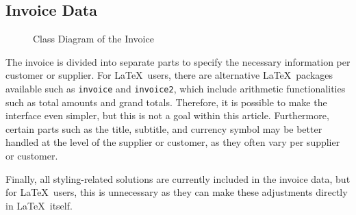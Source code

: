\subsection{Invoice Data}\label{sec:invoice data}
\begin{figure}[!ht]
    \centering
    
    \caption{Class Diagram of the Invoice}\label{fig:invoice-cd}
\end{figure}
\noindent
The invoice is divided into separate parts to specify the necessary information per customer or supplier.
For \LaTeX\ users, there are alternative \LaTeX\ packages available such as \texttt{invoice} and \texttt{invoice2}, which include arithmetic functionalities such as total amounts and grand totals.
Therefore, it is possible to make the interface even simpler, but this is not a goal within this article.
Furthermore, certain parts such as the title, subtitle, and currency symbol may be better handled at the level of the supplier or customer, as they often vary per supplier or customer.

Finally, all styling-related solutions are currently included in the invoice data, but for \LaTeX\ users, this is unnecessary as they can make these adjustments directly in \LaTeX\ itself.

